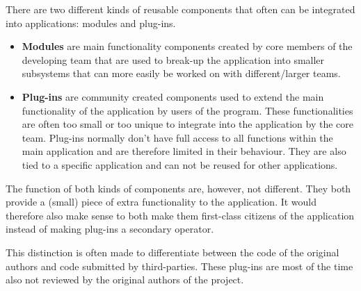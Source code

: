 There are two different kinds of reusable components that often can be integrated into applications: modules and plug-ins.

\begin{itemize}
	\item \textbf{Modules} are main functionality components created by core members of the developing team that are used to break-up the application into smaller subsystems that can more easily be worked on with different/larger teams.
	\item \textbf{Plug-ins} are  community created components used to extend the main functionality of the application by users of the program. These functionalities are often too small or too unique to integrate into the application by the core team. Plug-ins normally don't have full access to all functions within the main application and are therefore limited in their behaviour. They are also tied to a specific application and can not be reused for other applications.
\end{itemize}

The function of both kinds of components are, however, not different. They both provide a (small) piece of extra functionality to the application. It would therefore also make sense to both make them first-class citizens of the application instead of making plug-ins a secondary operator.

This distinction is often made to differentiate between the code of the original authors and code submitted by third-parties. These plug-ins are most of the time also not reviewed by the original authors of the project.

